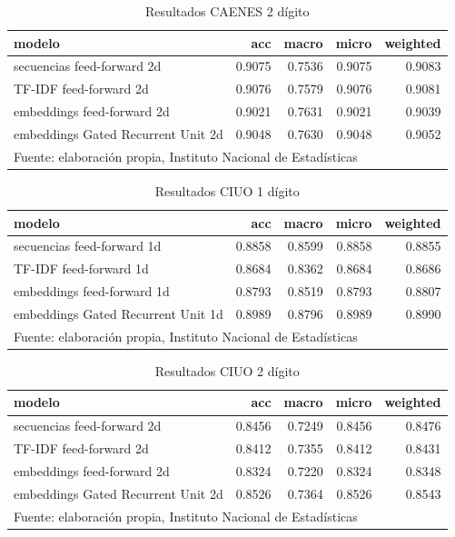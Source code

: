 \documentclass[
  12pt,
  spanish,
]{article}
\begin{document}
\begin{table}[H]

\caption{\label{tab:resultados_entrenamiento}Resultados CAENES 2 dígito}
\centering
\fontsize{9.5}{11.5}\selectfont
\begin{tabular}[t]{lrrrr}
\toprule
modelo & acc & macro & micro & weighted\\
\midrule
secuencias feed-forward 2d & 0.9075 & 0.7536 & 0.9075 & 0.9083\\
TF-IDF feed-forward 2d & 0.9076 & 0.7579 & 0.9076 & 0.9081\\
embeddings feed-forward 2d & 0.9021 & 0.7631 & 0.9021 & 0.9039\\
embeddings Gated Recurrent Unit 2d & 0.9048 & 0.7630 & 0.9048 & 0.9052\\
\bottomrule
\multicolumn{5}{l}{\rule{0pt}{1em}Fuente: elaboración propia, Instituto Nacional de Estadísticas }\\
\end{tabular}
\end{table}

\begin{table}[H]

\caption{\label{tab:resultados_entrenamiento}Resultados CIUO 1 dígito}
\centering
\fontsize{9.5}{11.5}\selectfont
\begin{tabular}[t]{lrrrr}
\toprule
modelo & acc & macro & micro & weighted\\
\midrule
secuencias feed-forward 1d & 0.8858 & 0.8599 & 0.8858 & 0.8855\\
TF-IDF feed-forward 1d & 0.8684 & 0.8362 & 0.8684 & 0.8686\\
embeddings feed-forward 1d & 0.8793 & 0.8519 & 0.8793 & 0.8807\\
embeddings Gated Recurrent Unit 1d & 0.8989 & 0.8796 & 0.8989 & 0.8990\\
\bottomrule
\multicolumn{5}{l}{\rule{0pt}{1em}Fuente: elaboración propia, Instituto Nacional de Estadísticas }\\
\end{tabular}
\end{table}

\begin{table}[H]

\caption{\label{tab:resultados_entrenamiento}Resultados CIUO 2 dígito}
\centering
\fontsize{9.5}{11.5}\selectfont
\begin{tabular}[t]{lrrrr}
\toprule
modelo & acc & macro & micro & weighted\\
\midrule
secuencias feed-forward 2d & 0.8456 & 0.7249 & 0.8456 & 0.8476\\
TF-IDF feed-forward 2d & 0.8412 & 0.7355 & 0.8412 & 0.8431\\
embeddings feed-forward 2d & 0.8324 & 0.7220 & 0.8324 & 0.8348\\
embeddings Gated Recurrent Unit 2d & 0.8526 & 0.7364 & 0.8526 & 0.8543\\
\bottomrule
\multicolumn{5}{l}{\rule{0pt}{1em}Fuente: elaboración propia, Instituto Nacional de Estadísticas }\\
\end{tabular}
\end{table}
\end{document}
